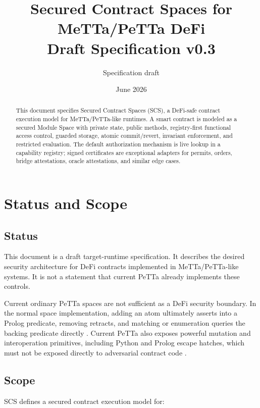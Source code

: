\documentclass[11pt]{article}
\title{Secured Contract Spaces for MeTTa/PeTTa DeFi\\\large Draft Specification v0.3}
\author{Specification draft}
\date{June 2026}
\newcommand{\SCS}{\textsc{SCS}}
\newcommand{\MeTTa}{MeTTa}
\newcommand{\PeTTa}{PeTTa}
\begin{document}
\maketitle

\begin{abstract}
This document specifies Secured Contract Spaces (\SCS{}), a DeFi-safe contract execution model for \MeTTa{}/\PeTTa{}-like runtimes. A smart contract is modeled as a secured Module Space with private state, public methods, registry-first functional access control, guarded storage, atomic commit/revert, invariant enforcement, and restricted evaluation. The default authorization mechanism is live lookup in a capability registry; signed certificates are exceptional adapters for permits, orders, bridge attestations, oracle attestations, and similar edge cases.
\end{abstract}

\tableofcontents
\newpage


\section{Status and Scope}

\subsection{Status}

This document is a draft target-runtime specification. It describes the desired security architecture for DeFi contracts implemented in \MeTTa{}/\PeTTa{}-like systems. It is not a statement that current \PeTTa{} already implements these controls.

Current ordinary \PeTTa{} spaces are not sufficient as a DeFi security boundary. In the normal space implementation, adding an atom ultimately asserts into a Prolog predicate, removing retracts, and matching or enumeration queries the backing predicate directly \cite{petta-spaces}. Current \PeTTa{} also exposes powerful mutation and interoperation primitives, including Python and Prolog escape hatches, which must not be exposed directly to adversarial contract code \cite{petta-metta}.

\subsection{Scope}

\SCS{} defines a secured contract execution model for:
\end{document}
